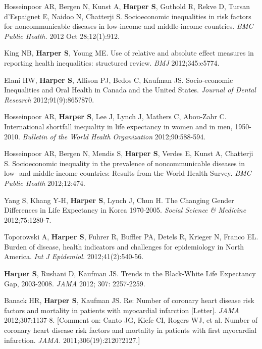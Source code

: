 \documentclass[
  letterpaper,
  DIV=11,
  numbers=noendperiod]{scrartcl}
\begin{document}
\begin{etaremune}
\item Hosseinpoor AR, Bergen N, Kunst A, \textbf{Harper S}, Guthold R, Rekve D, Tursan d'Espaignet E, Naidoo N, Chatterji S. Socioeconomic inequalities in risk factors for noncommunicable diseases in low-income and middle-income countries. \emph{BMC Public Health.} 2012 Oct 28;12(1):912.
 
\item King NB, \textbf{Harper S}, Young ME. Use of relative and absolute effect measures in reporting health inequalities: structured review. \emph{BMJ} 2012;345:e5774.
 
\item Elani HW, \textbf{Harper S}, Allison PJ, Bedos C, Kaufman JS. Socio-economic Inequalities and Oral Health in Canada and the United States. \emph{Journal of Dental Research} 2012;91(9):865?870. 
 
\item Hosseinpoor AR, \textbf{Harper S}, Lee J, Lynch J, Mathers C, Abou-Zahr C. International shortfall inequality in life expectancy in women and in men, 1950-2010. \emph{Bulletin of the World Health Organization} 2012;90:588-594.
 
\item Hosseinpoor AR, Bergen N, Mendis S, \textbf{Harper S}, Verdes E, Kunst A, Chatterji S. Socioeconomic inequality in the prevalence of noncommunicable diseases in low- and middle-income countries: Results from the World Health Survey. \emph{BMC Public Health} 2012;12:474.
 
\item Yang S, Khang Y-H, \textbf{Harper S}, Lynch J, Chun H. The Changing Gender Differences in Life Expectancy in Korea 1970-2005. \emph{Social Science \& Medicine} 2012;75:1280-7.
 
\item Toporowski A, \textbf{Harper S}, Fuhrer R, Buffler PA, Detels R, Krieger N, Franco EL. Burden of disease, health indicators and challenges for epidemiology in North America. \emph{Int J Epidemiol.} 2012;41(2):540-56.
 
\item \textbf{Harper S}, Rushani D, Kaufman JS. Trends in the Black-White Life Expectancy Gap, 2003-2008. \emph{JAMA} 2012; 307: 2257-2259.
 
\item Banack HR, \textbf{Harper S}, Kaufman JS. Re: Number of coronary heart disease risk factors and mortality in patients with myocardial infarction [Letter]. \emph{JAMA} 2012;307:1137-8. [Comment on: Canto JG, Kiefe CI, Rogers WJ, et al. Number of coronary heart disease risk factors and mortality in patients with first myocardial infarction. \emph{JAMA.} 2011;306(19):2120?2127.]
 

\end{etaremune}
\end{document}
